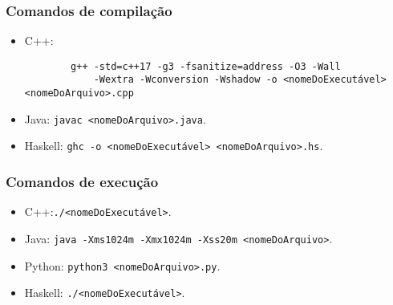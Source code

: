 \subsubsection*{Comandos de compilação}
\begin{itemize}
    \item C++: \begin{verbatim}
        g++ -std=c++17 -g3 -fsanitize=address -O3 -Wall 
            -Wextra -Wconversion -Wshadow -o <nomeDoExecutável> <nomeDoArquivo>.cpp
    \end{verbatim}
    \item Java: \verb|javac <nomeDoArquivo>.java|.
    \item Haskell: \verb|ghc -o <nomeDoExecutável> <nomeDoArquivo>.hs|.
\end{itemize}

\subsubsection*{Comandos de execução}
\begin{itemize}
    \item C++:\verb|./<nomeDoExecutável>|.
    \item Java: \verb|java -Xms1024m -Xmx1024m -Xss20m <nomeDoArquivo>|.
    \item Python: \verb|python3 <nomeDoArquivo>.py|.
    \item Haskell: \verb|./<nomeDoExecutável>|.
\end{itemize}
